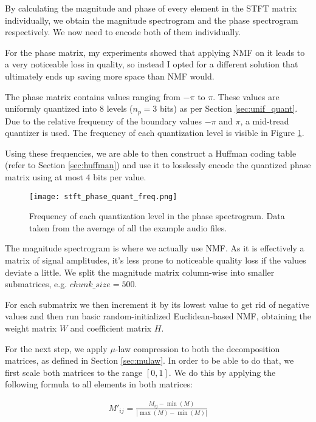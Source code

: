 By calculating the magnitude and phase of every element in the STFT matrix individually, we obtain the magnitude spectrogram and the phase spectrogram respectively. We now need to encode both of them individually.

For the phase matrix, my experiments showed that applying NMF on it leads to a very noticeable loss in quality, so instead I opted for a different solution that ultimately ends up saving more space than NMF would.

The phase matrix contains values ranging from $-\pi$ to $\pi$. These values are uniformly quantized into 8 levels ($n_p = 3$ bits) as per Section \ref{sec:unif_quant}. Due to the relative frequency of the boundary values $-\pi$ and $\pi$, a mid-tread quantizer is used. The frequency of each quantization level is visible in Figure \ref{fig:stft_phase_quant_freq}.

Using these frequencies, we are able to then construct a Huffman coding table (refer to Section \ref{sec:huffman}) and use it to losslessly encode the quantized phase matrix using at most 4 bits per value.

\begin{figure}[ht]
	\caption[ANMF-STFT quantized phase frequencies]{Frequency of each quantization level in the phase spectrogram. Data taken from the average of all the example audio files.}
	\label{fig:stft_phase_quant_freq}
	\centering
	\texttt{[image: stft\_phase\_quant\_freq.png]}
\end{figure}

The magnitude spectrogram is where we actually use NMF. As it is effectively a matrix of signal amplitudes, it's less prone to noticeable quality loss if the values deviate a little. We split the magnitude matrix column-wise into smaller submatrices, e.g. $chunk\_size = 500$.

For each submatrix we then increment it by its lowest value to get rid of negative values and then run basic random-initialized Euclidean-based NMF, obtaining the weight matrix $W$ and coefficient matrix $H$.

For the next step, we apply $\mu$-law compression to both the decomposition matrices, as defined in Section \ref{sec:mulaw}. In order to be able to do that, we first scale both matrices to the range $[0, 1]$. We do this by applying the following formula to all elements in both matrices:

\begin{align}
\label{equ:scale_01}
M'_{ij} = \frac{M_{ij} - \min(M)}{|\max(M) - \min(M)|}
\end{align}

